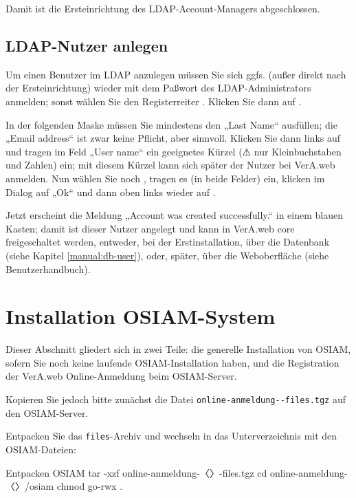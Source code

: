 Damit ist die Ersteinrichtung des LDAP-Account-Managers abgeschlossen.

\subsection{LDAP-Nutzer anlegen}\label{subsec:setup-lam-adduser}

Um einen Benutzer im LDAP anzulegen müssen Sie sich ggfs. (außer direkt
nach der Ersteinrichtung) wieder mit dem Paßwort des LDAP-Administrators
anmelden; sonst wählen Sie den Registerreiter .
Klicken Sie dann auf .

In der folgenden Maske müssen Sie mindestens den „Last Name“ ausfüllen;
die „Email address“ ist zwar keine Pflicht, aber sinnvoll.
Klicken Sie dann links auf  und tragen im Feld
„User name“ ein geeignetes Kürzel (⚠ nur Kleinbuchstaben und Zahlen) ein;
mit diesem Kürzel kann sich später der Nutzer bei VerA.web anmelden. Nun
wählen Sie noch , tragen es (in beide
Felder) ein, klicken im Dialog auf „Ok“ und dann oben links wieder auf
.

Jetzt erscheint die Meldung „Account was created successfully.“ in einem
blauen Kasten; damit ist dieser Nutzer angelegt und kann in VerA.web core
freigeschaltet werden, entweder, bei der Erstinstallation, über die
Datenbank (siehe Kapitel \ref{manual:db-user}), oder, später, über die
Weboberfläche (siehe Benutzerhandbuch).

\ifoa
\section{Installation OSIAM-System}\label{sec:setup-osiam}

Dieser Abschnitt gliedert sich in zwei Teile: die generelle Installation
von OSIAM, sofern Sie noch keine laufende OSIAM-Installation haben, und
die Registration der VerA.web Online-Anmeldung beim OSIAM-Server.

Kopieren Sie jedoch bitte zunächst die Datei
\texttt{online-anmeldung-\vwiaverssw{}-files.tgz}
auf den OSIAM-Server.

\begin{minipage}{\linewidth}
Entpacken Sie das \texttt{files}-Archiv und wechseln in das
Unterverzeichnis mit den OSIAM-Dateien:

\begin{lstdump}{Entpacken OSIAM}
tar -xzf online-anmeldung-〈\lstdumpesc{\vwiaverssw}〉-files.tgz
cd online-anmeldung-〈\lstdumpesc{\vwiaverssw}〉/osiam
chmod go-rwx .
\end{lstdump}
\end{minipage}

